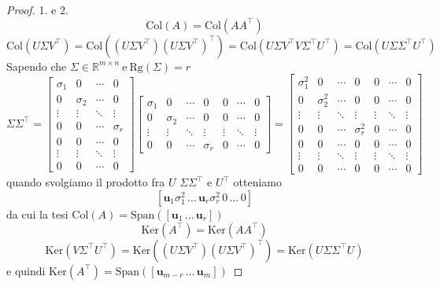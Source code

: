 \documentclass[11pt]{article}
\newcommand{\R}{\mathbb{R}}
\begin{document}
\begin{proof}{1. e 2.}
\[
\text{Col}(A)=\text{Col}(AA^\top      )
\]
\[
\text{Col}(U\Sigma V^\top      )=\text{Col}((U\Sigma V^\top      )(U\Sigma V^\top      )^\top      )=\text{Col}(U\Sigma V^\top      V\Sigma^\top U^\top)=\text{Col}(U\Sigma \Sigma^\top U^\top)
\]
Sapendo che $ \Sigma \in \R^{m \times n} \ \text{e} \ \text{Rg}(\Sigma)=r$
\[
\Sigma \Sigma^\top       = \begin{bmatrix}
\sigma_1 & 0 & \cdots & 0 \\
0 & \sigma_2 & \cdots & 0 \\
\vdots & \vdots & \ddots & \vdots \\
0 & 0 & \cdots & \sigma_r \\
0 & 0 & \cdots & 0 \\
\vdots & \vdots & \ddots & \vdots \\
0 & 0 & \cdots & 0
\end{bmatrix}
\begin{bmatrix}
\sigma_1 & 0 & \cdots & 0 & 0 & \cdots & 0 \\
0 & \sigma_2 & \cdots & 0 & 0 & \cdots & 0 \\
\vdots & \vdots & \ddots & \vdots & \vdots & \ddots & \vdots \\
0 & 0 & \cdots & \sigma_r & 0 & \cdots & 0
\end{bmatrix}
=
\begin{bmatrix}
\sigma_1^2 & 0 & \cdots & 0 & 0 & \cdots & 0 \\
0 & \sigma_2^2 & \cdots & 0 & 0 & \cdots & 0 \\
\vdots & \vdots & \ddots & \vdots & \vdots & \ddots & \vdots \\
0 & 0 & \cdots & \sigma_r^2 & 0 & \cdots & 0 \\
0 & 0 & \cdots & 0 & 0 & \cdots & 0 \\
\vdots & \vdots & \ddots & \vdots & \vdots & \ddots & \vdots \\
0 & 0 & \cdots & 0 & 0 & \cdots & 0
\end{bmatrix}
\]
quando svolgiamo il prodotto fra $U$ $\Sigma \Sigma^\top $ e $U^\top$ otteniamo \[
[\mathbf{u}_1 \sigma_1^2 \, \dots \, \mathbf{u}_r \sigma_r^2 \, 0 \, \dots \, 0]
\]
da cui la tesi $\text{Col}(A)=\text{Span}([\mathbf{u}_1 \, \dots \, \mathbf{u}_r])$
$$\text{Ker}(A^\top      )=\text{Ker}(AA^\top      )$$ 
\[
\text{Ker}(V\Sigma^\top      U^\top      )=\text{Ker}((U\Sigma V^\top      )(U \Sigma V^\top      )^\top      )=\text{Ker}(U\Sigma \Sigma^\top       U)
\]
e quindi $\text{Ker}(A^\top      )=\text{Span}([\mathbf{u}_{m-r} \, \dots \, \mathbf{u}_m])$
\end{proof}
\end{document}
